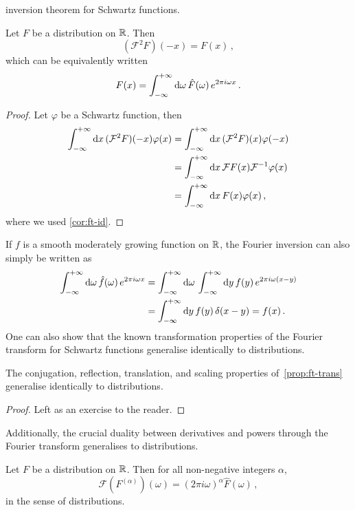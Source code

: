 inversion theorem for Schwartz functions.
\begin{theorem}
	Let $F$ be a distribution on $\mathbb{R}$. Then
	\begin{equation}
		(\mathcal{F}^2F)(-x)=F(x)\,,
	\end{equation}
	which can be equivalently written
	\begin{equation}
		F(x)=\int_{-\infty}^{+\infty}\mathrm{d}{\omega}\,\hat{F}(\omega)\,e^{2\pi i\omega x}\,.
	\end{equation}
\end{theorem}
\begin{proof}
	Let $\varphi$ be a Schwartz function, then
	\begin{align}
		\int_{-\infty}^{+\infty}\mathrm{d}{x}\,(\mathcal{F}^2F)(-x)\varphi(x)
		 & =\int_{-\infty}^{+\infty}\mathrm{d}{x}\,(\mathcal{F}^2F)(x)\varphi(-x)\notag            \\
		 & =\int_{-\infty}^{+\infty}\mathrm{d}{x}\,\mathcal{F}F(x)\mathcal{F}^{-1}\varphi(x)\notag \\
		 & =\int_{-\infty}^{+\infty}\mathrm{d}{x}\,F(x)\varphi(x)\,,
	\end{align}
	where we used \cref{cor:ft-id}.
\end{proof}
If $f$ is a smooth moderately growing function on $\mathbb{R}$, the Fourier inversion can also
simply be written as
\begin{align}
	\int_{-\infty}^{+\infty}\mathrm{d}{\omega}\,\hat{f}(\omega)\,e^{2\pi i\omega x} & =
	\int_{-\infty}^{+\infty}\mathrm{d}{\omega}\,\int_{-\infty}^{+\infty}\mathrm{d}{y}\,f(y)\,e^{2\pi i\omega (x-y)}\notag                               \\
	                                                 & =\int_{-\infty}^{+\infty}\mathrm{d}{y}\,f(y)\,\delta(x-y)=f(x)\,.
\end{align}
One can also show that the known transformation properties of the Fourier transform for
Schwartz functions generalise identically to distributions.
\begin{proposition}
	The conjugation, reflection, translation, and scaling properties of~\cref{prop:ft-trans}
	generalise identically to distributions.
\end{proposition}
\begin{proof}
	Left as an exercise to the reader.
\end{proof}
Additionally, the crucial duality between derivatives and powers through the Fourier
transform generalises to distributions.
\begin{proposition}
	\label{prop:ft-der-distrib}
	Let $F$ be a distribution on $\mathbb{R}$. Then for all non-negative integers $\alpha$,
	\begin{equation}
		\mathcal{F}(F^{(\alpha)})(\omega)=(2\pi i\omega)^{\alpha}\hat{F}(\omega)\,,
	\end{equation}
	in the sense of distributions.
\end{proposition}
